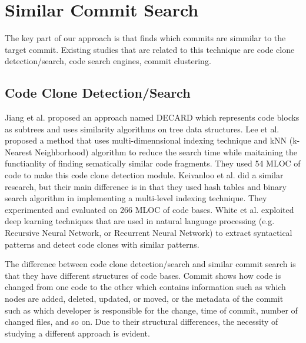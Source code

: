 \section{Similar Commit Search}
The key part of our approach is that {\simfin} finds which commits are simmilar to the target commit.
Existing studies that are related to this technique are code clone detection/search, code search engines, commit clustering.

\subsection{Code Clone Detection/Search}
Jiang et al. \cite{jiang2007deckard} proposed an approach named DECARD which represents code blocks as subtrees and uses similarity algorithms on tree data structures.
Lee et al. \cite{lee2010instant} proposed a method that uses multi-dimennsional indexing technique and kNN (k-Nearest Neighborhood) algorithm to reduce the search time while maitaining the functianlity of finding sematically similar code fragments.
They used 54 MLOC of code to make this code clone detection module.
Keivanloo et al. \cite{keivanloo2011internet} did a similar research, but their main difference is in that they used hash tables and binary search algorithm in implementing a multi-level indexing technique.
They experimented and evaluated on 266 MLOC of code bases.
White et al. \cite{white2016deep} exploited deep learning techniques that are used in natural language processing (e.g. Recursive Neural Network, or Recurrent Neural Network) to extract syntactical patterns and detect code clones with similar patterns. 

The difference between code clone detection/search and similar commit search is that they have different structures of code bases.
Commit shows how code is changed from one code to the other which contains information such as which nodes are added, deleted, updated, or moved, or the metadata of the commit such as which developer is responsible for the change, time of commit, number of changed files, and so on.
Due to their structural differences, the necessity of studying a different approach is evident. 

